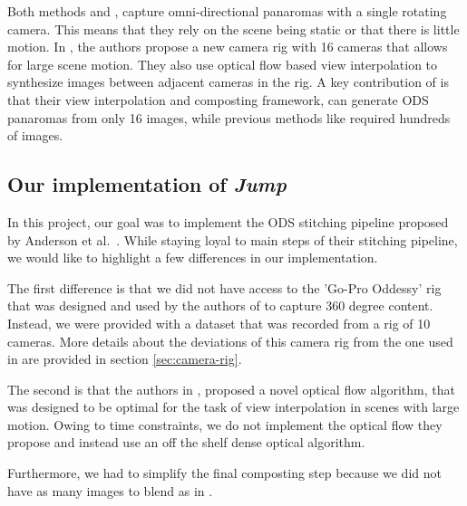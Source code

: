 \documentclass[10pt,twocolumn,letterpaper]{article}
\begin{document}
Both methods \cite{peleg} and \cite{megastereo}, capture omni-directional panaromas with a single rotating camera. This means that they rely on the scene being static or that there is little motion. In \cite{jump16}, the authors propose a new camera rig with 16 cameras that allows for large scene motion. They also use optical flow based view interpolation to synthesize images between adjacent cameras in the rig. A key contribution of \cite{jump16} is that their view interpolation and composting framework, can generate ODS panaromas from only 16 images, while previous methods like \cite{megastereo} required hundreds of images. 

\subsection{Our implementation of \textit{Jump} \cite{jump16}}
In this project, our goal was to implement the ODS stitching pipeline proposed by Anderson et al.~\cite{jump16}. While staying loyal to main steps of their stitching pipeline, we would like to highlight a few differences in our implementation. 

The first difference is that we did not have access to the 'Go-Pro Oddessy' rig that was designed and used by the authors of \cite{jump16} to capture 360 degree content. Instead, we were provided with a dataset that was recorded from a rig of 10 cameras. More details about the deviations of this camera rig from the one used in \cite{jump16} are provided in section \ref{sec:camera-rig}. 

The second is that the authors in \cite{jump16}, proposed a novel optical flow algorithm, that was designed to be optimal for the task of view interpolation in scenes with large motion.  Owing to time constraints, we do not implement the optical flow they propose and instead use an off the shelf dense optical algorithm. 

Furthermore, we had to simplify the final composting step because we did not have as many images to blend as in \cite{jump16}.

\end{document}
